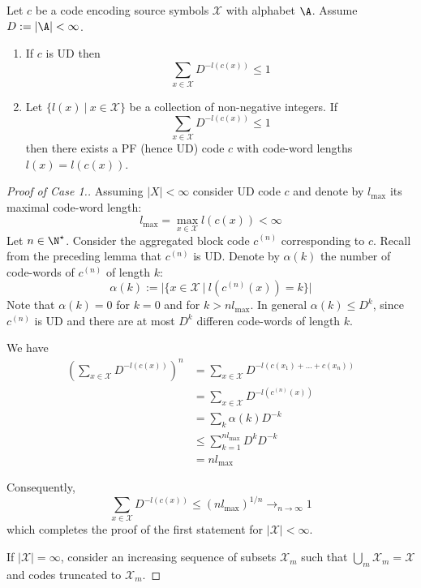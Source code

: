 \documentclass{../cs-classes/cs-classes}
\newcommand*{\X}{\mathcal{X}}
\begin{document}
\begin{theorem}
    Let $c$ be a code encoding source symbols $\X$ with alphabet $\A$. Assume $D:=|\A|<\infty$. 
    \begin{enumerate}
        \item If $c$ is UD then
        \begin{equation}
            \label{eq:kraft-ineq}
            \sum_{x\in\X} D^{-l(c(x))}\leq 1
        \end{equation}

        \item Let $\{l(x)\: |\:x\in\X\}$ be a collection of non-negative integers. If
        \begin{equation*}
            \sum_{x\in\X} D^{-l(c(x))}\leq 1
        \end{equation*}
        then there exists a PF (hence UD) code $c$ with code-word lengths $l(x)=l(c(x))$.
    \end{enumerate}
\end{theorem}

\begin{proof}[Proof of Case 1.]
    Assuming $|X|<\infty$ consider UD code $c$ and denote by $l_{\max}$ its maximal code-word length:
    \begin{equation*}
        l_{\max}=\max_{x\in\X} l(c(x)) <\infty
    \end{equation*}
    Let $n\in\N^\star$. Consider the aggregated block code $c^{(n)}$ corresponding to $c$. Recall from the preceding lemma that $c^{(n)}$ is UD. Denote by $\alpha(k)$ the number of code-words of $c^{(n)}$ of length $k$:
    \begin{equation*}
        \alpha(k) := |\{x\in\X \: | \: l(c^{(n)}(x)) = k\}|
    \end{equation*}
    Note that $\alpha(k)=0$ for $k=0$ and for $k>nl_{\max}$. In general $\alpha(k)\leq D^k$, since $c^{(n)}$ is UD and there are at most $D^k$ differen code-words of length $k$.

    We have
    \begin{equation*}
        \begin{aligned}
            \left(\sum_{x\in\X} D^{-l(c(x))}\right)^n &= \sum_{x\in\X} D^{-l(c(x_1)+\dots+c(x_n))}\\
            &= \sum_{x\in\X} D^{-l(c^{(n)}(x))}\\
            &= \sum_{k} \alpha(k)D^{-k}\\
            &\leq \sum_{k=1}^{nl_{\max}} D^kD^{-k}\\
            &= nl_{\max}
        \end{aligned}
    \end{equation*}

    Consequently,
    \begin{equation*}
        \sum_{x\in\X} D^{-l(c(x))} \leq (nl_{\max})^{1/n} \to_{n\to\infty} 1
    \end{equation*}
    which completes the proof of the first statement for $|\X|<\infty$.

    If $|\X|=\infty$, consider an increasing sequence of subsets $\X_m$ such that $\bigcup_m \X_m = \X$ and codes truncated to $\X_m$.
\end{proof}
\end{document}
